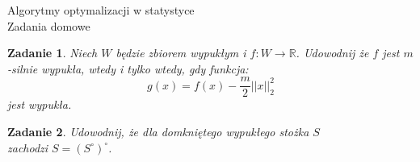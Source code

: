 \documentclass[10pt,a4paper,draft]{report}
\begin{document}
\newcommand{\rset}{\mathbb{R}}
\newcommand{\steps}{\gamma}

\newtheorem{theorem}{Twierdzenie}


\newtheorem{lemma}[lemma]{Lemma}

\newtheorem{corollary}[corollary]{Wniosek}

\newtheorem{proposition}[proposition]{Proposition}

\newtheorem{definition}[definition]{Definicja}

\newtheorem{remark}[remark]{Remark}


\newtheorem{example}[theorem]{Example}

\newtheorem{problem}{Zadanie}

\newenvironment{proof}{\textbf{Dowód}}

\title{Algorytmy optymalizacji w statystyce \\ Zadania domowe}

\begin{problem}
Niech $W$ będzie zbiorem wypukłym i $f : W \rightarrow \rset$. Udowodnij że $f$ jest $m$-silnie wypukła, wtedy i tylko wtedy, gdy funkcja:
\[
g(x) = f(x) - \frac{m}{2}||x||_2^2
\]
jest wypukła.
\end{problem}
\begin{problem}
Udowodnij, że dla domkniętego wypukłego stożka $S$ \\ zachodzi $S = \left( S^{\circ}\right)^{\circ}$.
\end{problem}
\end{document}
